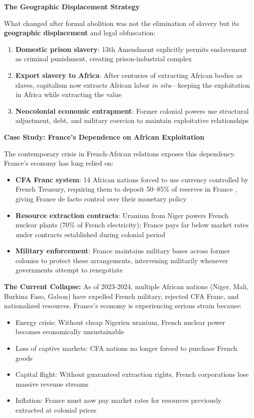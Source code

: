 \documentclass[12pt]{article}
\begin{document}
\textbf{The Geographic Displacement Strategy}

What changed after formal abolition was not the elimination of slavery but its \textbf{geographic displacement} and legal obfuscation:

\begin{enumerate}
    \item \textbf{Domestic prison slavery}: 13th Amendment explicitly permits enslavement as criminal punishment, creating prison-industrial complex
    \item \textbf{Export slavery to Africa}: After centuries of extracting African bodies as slaves, capitalism now extracts African labor \textit{in situ}---keeping the exploitation in Africa while extracting the value
    \item \textbf{Neocolonial economic entrapment}: Former colonial powers use structural adjustment, debt, and military coercion to maintain exploitative relationships
\end{enumerate}

\textbf{Case Study: France's Dependence on African Exploitation}

The contemporary crisis in French-African relations exposes this dependency. France's economy has long relied on:

\begin{itemize}
    \item \textbf{CFA Franc system}: 14 African nations forced to use currency controlled by French Treasury, requiring them to deposit 50--85\% of reserves in France \cite{pigeaud}, giving France de facto control over their monetary policy
    \item \textbf{Resource extraction contracts}: Uranium from Niger powers French nuclear plants (70\% of French electricity); France pays far below market rates under contracts established during colonial period
    \item \textbf{Military enforcement}: France maintains military bases across former colonies to protect these arrangements, intervening militarily whenever governments attempt to renegotiate
\end{itemize}

\textbf{The Current Collapse:} As of 2023-2024, multiple African nations (Niger, Mali, Burkina Faso, Gabon) have expelled French military, rejected CFA Franc, and nationalized resources. France's economy is experiencing serious strain because:

\begin{itemize}
    \item Energy crisis: Without cheap Nigerien uranium, French nuclear power becomes economically unsustainable
    \item Loss of captive markets: CFA nations no longer forced to purchase French goods
    \item Capital flight: Without guaranteed extraction rights, French corporations lose massive revenue streams
    \item Inflation: France must now pay market rates for resources previously extracted at colonial prices
\end{itemize}
\end{document}
